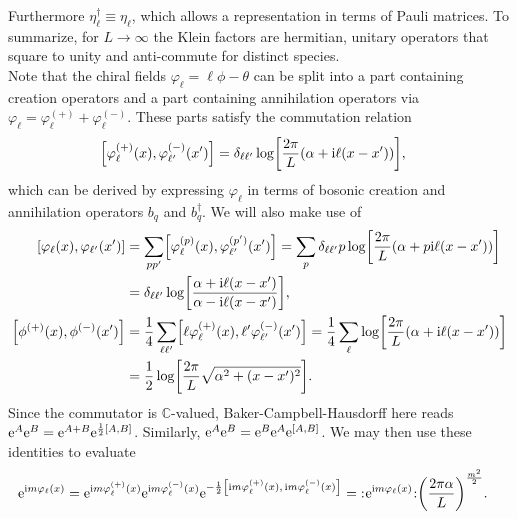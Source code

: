 \documentclass[english, parskip=full]{scrartcl}
\begin{document}
Furthermore $\eta_\ell^\dagger \equiv \eta_\ell$, which allows a representation in terms of Pauli matrices.
To summarize, for $L\rightarrow\infty$ the Klein factors are hermitian, unitary operators that square to unity and anti-commute for distinct species.\\
Note that the chiral fields $\varphi_\ell = \ell\phi - \theta$ can be split into a part containing creation operators and a part containing annihilation operators via $\varphi_\ell = \varphi_\ell^{(+)} + \varphi_\ell^{(-)}$.
These parts satisfy the commutation relation
\begin{align}
\klb*{\varphi_\ell^{(+)}(x), \varphi_{\ell'}^{(-)}(x')} &= \delta_{\ell\ell'} \log\klb*{\frac{2\pi}{L} \kla*{\alpha + \i\ell (x-x')} } \label{eqn:commutator_varphi_ell_plus_x_varphi_ellp_minus_xp},
\end{align}
which can be derived by expressing $\varphi_\ell$ in terms of bosonic creation and annihilation operators $b_q$ and $b_q^\dagger$.
We will also make use of
\begin{align}
\klb*{\varphi_\ell(x), \varphi_{\ell'}(x')} &= \sum_{pp'} \klb*{\varphi_\ell^{(p)}(x), \varphi_{\ell'}^{(p')}(x')} = \sum_p \delta_{\ell\ell'} p \log\klb*{\frac{2\pi}{L} \kla*{\alpha + p\i\ell (x-x')} } \\
&= \delta_{\ell\ell'} \log \klb*{ \frac{\alpha + \i \ell (x-x')}{\alpha - \i \ell (x-x')}} \label{eqn:commutator_varphi_ell_x_varphi_ellp_xp},\\
\klb*{\phi^{(+)}(x), \phi^{(-)}(x')} &= \frac{1}{4} \sum_{\ell\ell'} \klb*{\ell\varphi_\ell^{(+)}(x), \ell'  \varphi_{\ell'}^{(-)}(x')} = \frac{1}{4} \sum_\ell \log \klb*{\frac{2\pi}{L} \kla*{\alpha + \i\ell (x-x')} } \\
&= \frac{1}{2} \log \klb*{\frac{2\pi}{L} \sqrt{\alpha^2 + (x-x')^2}} \label{eqn:commutator_phi_plus_x_phi_minus_xp}.
\end{align}
Since the commutator is $\mathbb{C}$-valued, Baker-Campbell-Hausdorff here reads $\powe{A}\powe{B} = \powe{A+B} \powe{\frac{1}{2} \klb*{A,B}}$.
Similarly, $\powe{A}\powe{B} = \powe{B}\powe{A} \powe{\klb*{A,B}}$.
We may then use these identities to evaluate
\begin{align}
\powe{\i m\varphi_\ell(x)} &= \powe{\i m\varphi_\ell^{(+)}(x)} \powe{\i m\varphi_\ell^{(-)}(x)} \powe{-\frac{1}{2} \klb*{\i m\varphi_\ell^{(+)}(x),\, \i m\varphi_\ell^{(-)}(x)}} = \normord{\powe{\i m\varphi_\ell(x)}} \kla*{\frac{2\pi \alpha}{L}}^{\frac{m^2}{2}}.
\end{align}
\end{document}
